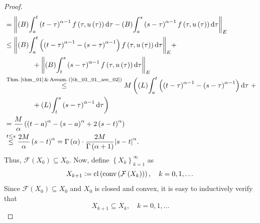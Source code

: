 \documentclass[reqno]{amsart}
\numberwithin{equation}{section}
\theoremstyle{definition}
\theoremstyle{remark}
\newcommand{\assumRef}[1]{\textrm{Assum.\,}\br{\textrm{\ref{#1}}}}
\newcommand{\Bint}[3]{\br{B}\!\displaystyle\int_{#1}^{#2}{#3}}
\newcommand{\br}[1]{\left(#1\right)}
\newcommand{\cbr}[1]{\left\{#1\right\}}
\newcommand{\cl}[1]{\clOperator\br{#1}}
\newcommand{\conv}[1]{\convOperator\br{#1}}
\newcommand{\defeq}{\vcentcolon=}
\newcommand{\dtau}{\mathrm{d}\tau}
\newcommand{\fF}{\mathcal{F}}
\newcommand{\leqText}[1]{\stackrel{#1}{\leq}}
\newcommand{\Lint}[3]{\br{L}\!\displaystyle\int_{#1}^{#2}{#3}}
\newcommand{\thmRef}[1]{\textrm{Thm.\,\ref{#1}}}
\DeclareMathOperator{\clOperator}{cl}
\DeclareMathOperator{\convOperator}{conv}
\begin{document}
\begin{proof}
\begin{equation*}
\begin{aligned}
			&=\norm{\Bint{a}{t}{\br{t-\tau}^{\alpha-1}f\br{\tau,u\br{\tau}}\dtau}-\Bint{a}{s}{\br{s-\tau}^{\alpha-1}f\br{\tau,u\br{\tau}}\dtau}}_E\\
			&\leq\norm{\Bint{a}{t}{\br{\br{t-\tau}^{\alpha-1}-\br{s-\tau}^{\alpha-1}}f\br{\tau,u\br{\tau}}\dtau}}_E+\\
			&\qquad\qquad+\norm{\Bint{t}{s}{\br{s-\tau}^{\alpha-1}f\br{\tau,u\br{\tau}}\dtau}}_E\\
			&\leqText{\thmRef{thm_01}\,\&\,\assumRef{th_03_01_ass_02}}M\left(\Lint{a}{t}{\br{\br{t-\tau}^{\alpha-1}-\br{s-\tau}^{\alpha-1}}\dtau}\right.+\\
			&\qquad\qquad+\Lint{t}{s}{\br{s-\tau}^{\alpha-1}\dtau}\biggr)\\
			&=\frac{M}{\alpha}\br{\br{t-a}^{\alpha}-\br{s-a}^{\alpha}+2\br{s-t}^{\alpha}}\\
			&\leqText{t\leq{s}}\frac{2M}{\alpha}\br{s-t}^{\alpha}=\Gamma\br{\alpha}\cdot\frac{2M}{\Gamma\br{\alpha+1}}\abs{s-t}^{\alpha}.
		\end{aligned}
	\end{equation*}
	Thus, $\fF\br{X_0}\subseteq{X}_0$. Now, define $\cbr{X_k}_{k=1}^{\infty}$ as
	\begin{equation}\label{eq_03_08}
		X_{k+1}\defeq\cl{\conv{\fF\br{X_k}}},\quad{k}=0,1,\dots
	\end{equation}
	Since $\fF\br{X_0}\subseteq{X_0}$ and $X_0$ is closed and convex, it is easy to inductively verify that
	\begin{equation}\label{eq_03_09}
		X_{k+1}\subseteq{X}_k,\quad{k}=0,1,\dots
	\end{equation}
	

\end{proof}
\end{document}

